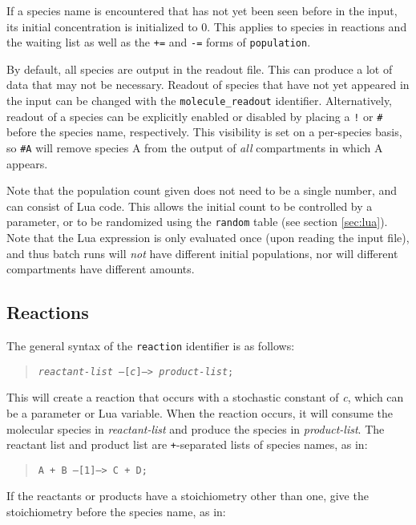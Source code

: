 \documentclass[10pt]{article}
\newcommand{\code}[1]{{\tt {#1}}}
\newcommand{\codeparam}[1]{\textrm{\textit{#1}}}
\begin{document}
If a species name is encountered that has not yet been seen before in the input, its initial concentration is initialized to 0. This applies to species in reactions and the waiting list as well as the \code{+=} and \code{-=} forms of \code{population}.

By default, all species are output in the readout file. This can produce a lot of data that may not be necessary. Readout of species that have not yet appeared in the input can be changed with the \code{molecule\_readout} identifier. Alternatively, readout of a species can be explicitly enabled or disabled by placing a \code{!} or \code{\#} before the species name, respectively. This visibility is set on a per-species basis, so \code{\#A} will remove species A from the output of \emph{all} compartments in which A appears.

Note that the population count given does not need to be a single number, and can consist of Lua code. This allows the initial count to be controlled by a parameter, or to be randomized using the \code{random} table (see section \ref{sec:lua}). Note that the Lua expression is only evaluated once (upon reading the input file), and thus batch runs will \emph{not} have different initial populations, nor will different compartments have different amounts.

\subsection{Reactions}
\label{sec:reaction}

The general syntax of the \code{reaction} identifier is as follows:

\begin{quote}
\code{\codeparam{reactant-list} --[\codeparam{c}]--> \codeparam{product-list};}
\end{quote}

This will create a reaction that occurs with a stochastic constant of \codeparam{c}, which can be a parameter or Lua variable. When the reaction occurs, it will consume the molecular species in \codeparam{reactant-list} and produce the species in \codeparam{product-list}. The reactant list and product list are \code{+}-separated lists of species names, as in:

\begin{quote}
\code{A + B --[1]--> C + D;}
\end{quote}

If the reactants or products have a stoichiometry other than one, give the stoichiometry before the species name, as in:
\end{document}
